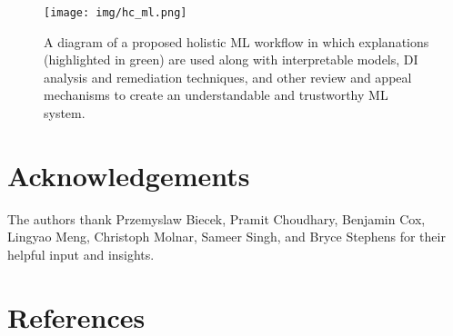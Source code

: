 \documentclass{article}
\begin{document}
\begin{figure}[htb!]
	\begin{center}
		\texttt{[image: img/hc\_ml.png]}
		\caption{A diagram of a proposed holistic ML workflow in which explanations (highlighted in green) are used along with interpretable models, DI analysis and remediation techniques, and other review and appeal mechanisms to create an understandable and trustworthy ML system.}
		\label{fig:hc_ml}
	\end{center}
\end{figure}

\clearpage
\section*{Acknowledgements}

The authors thank Przemyslaw Biecek, Pramit Choudhary, Benjamin Cox, Lingyao Meng, Christoph Molnar, Sameer Singh, and Bryce Stephens for their helpful input and insights. 

\section*{References}
\small


\end{document}
